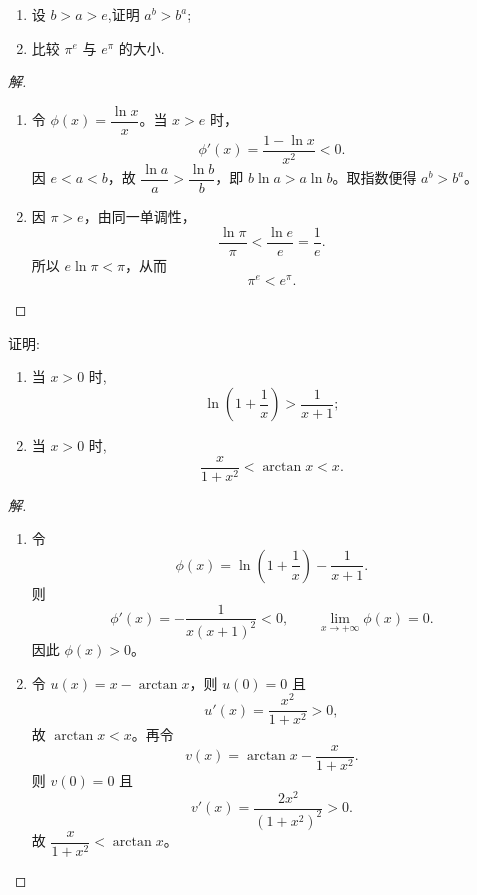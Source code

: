 \documentclass[../../数学分析培优讲义(答案版).tex]{subfiles}
\begin{document}
\begin{example}
\begin{enumerate}[label=(\arabic*)]
    \item 设 $b>a>e$,证明 $a^b>b^a$;
    \item 比较 $\pi^e$ 与 $e^\pi$ 的大小.
\end{enumerate}
\end{example}

\begin{proof}[解]
\begin{enumerate}[label=(\arabic*)]
    \item 令 $\phi(x)=\dfrac{\ln x}{x}$。当 $x>e$ 时，
    \[
        \phi'(x)=\dfrac{1-\ln x}{x^2}<0.
    \]
    因 $e<a<b$，故 $\dfrac{\ln a}{a}>\dfrac{\ln b}{b}$，即 $b\ln a>a\ln b$。取指数便得 $a^b>b^a$。

    \item 因 $\pi>e$，由同一单调性，
    \[
        \dfrac{\ln\pi}{\pi}<\dfrac{\ln e}{e}=\dfrac{1}{e}.
    \]
    所以 $e\ln\pi<\pi$，从而
    \[
        \boxed{\pi^e<e^\pi}.
    \]
\end{enumerate}
\end{proof}


\begin{example}
证明:
\begin{enumerate}[label=(\arabic*)]
    \item 当 $x>0$ 时,
    \[
        \ln\left(1+\dfrac{1}{x}\right)>\dfrac{1}{x+1};
    \]
    \item 当 $x>0$ 时,
    \[
        \dfrac{x}{1+x^2}<\arctan x<x.
    \]
\end{enumerate}
\end{example}

\begin{proof}[解]
\begin{enumerate}[label=(\arabic*)]
    \item 令
    \[
        \phi(x)=\ln\left(1+\dfrac{1}{x}\right)-\dfrac{1}{x+1}.
    \]
    则
    \[
        \phi'(x)=-\dfrac{1}{x(x+1)^2}<0,
        \qquad
        \lim\limits_{x\to+\infty}\phi(x)=0.
    \]
    因此 $\phi(x)>0$。

    \item 令 $u(x)=x-\arctan x$，则 $u(0)=0$ 且
    \[
        u'(x)=\dfrac{x^2}{1+x^2}>0,
    \]
    故 $\arctan x<x$。再令
    \[
        v(x)=\arctan x-\dfrac{x}{1+x^2}.
    \]
    则 $v(0)=0$ 且
    \[
        v'(x)=\dfrac{2x^2}{(1+x^2)^2}>0.
    \]
    故 $\dfrac{x}{1+x^2}<\arctan x$。
\end{enumerate}
\end{proof}
\end{document}
